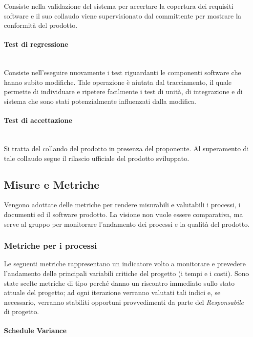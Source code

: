 			Consiste nella validazione del sistema per accertare la copertura dei requisiti software e il suo collaudo viene supervisionato dal committente per mostrare la conformità del prodotto.
			
			\paragraph{Test di regressione} \mbox{} \\

			Consiste nell'eseguire nuovamente i test riguardanti le componenti software che hanno subito modifiche.	Tale operazione è aiutata dal tracciamento, il quale permette di individuare e ripetere facilmente i test di unità, di integrazione e di sistema che sono stati potenzialmente influenzati dalla modifica.
			
			\paragraph{Test di accettazione} \mbox{} \\

			Si tratta del collaudo del prodotto in presenza del proponente. Al superamento di tale collaudo segue il rilascio ufficiale del prodotto sviluppato.
			
	
	\subsection{Misure e Metriche}
	\label{MisureMetriche}
	
	Vengono adottate delle metriche per rendere misurabili e valutabili i processi, i documenti ed il software prodotto. La visione non vuole essere comparativa, ma serve al gruppo per monitorare l'andamento dei processi e la qualità del prodotto.
		
		\subsubsection{Metriche per i processi}
		Le seguenti metriche rappresentano un indicatore volto a monitorare e prevedere l'andamento delle principali variabili critiche del progetto (i tempi e i costi). Sono state scelte metriche di tipo  perché danno un riscontro immediato sullo stato attuale del progetto; ad ogni iterazione verranno valutati tali indici e, se necessario, verranno stabiliti opportuni provvedimenti da parte del \emph{Responsabile} di progetto.
		
			\paragraph{Schedule Variance} \mbox{} \\

